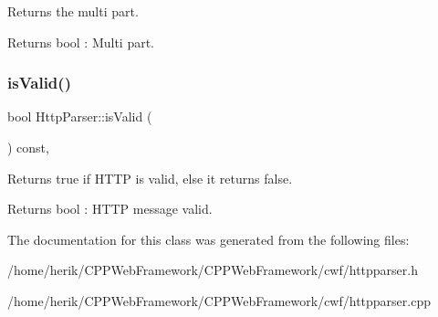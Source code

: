 Returns the multi part. 

\begin{DoxyReturn}{Returns}
bool \+: Multi part. 
\end{DoxyReturn}
\mbox{\label{class_http_parser_a6d5020425a4dff7b78acbf37a20cccba}} 
\subsubsection{\texorpdfstring{is\+Valid()}{isValid()}}
{\footnotesize\ttfamily bool Http\+Parser\+::is\+Valid (\begin{DoxyParamCaption}{ }\end{DoxyParamCaption}) const\hspace{0.3cm}{\ttfamily [inline]}, {\ttfamily [noexcept]}}



Returns true if H\+T\+TP is valid, else it returns false. 

\begin{DoxyReturn}{Returns}
bool \+: H\+T\+TP message valid. 
\end{DoxyReturn}


The documentation for this class was generated from the following files\+:\begin{DoxyCompactItemize}
\item 
/home/herik/\+C\+P\+P\+Web\+Framework/\+C\+P\+P\+Web\+Framework/cwf/httpparser.\+h\item 
/home/herik/\+C\+P\+P\+Web\+Framework/\+C\+P\+P\+Web\+Framework/cwf/httpparser.\+cpp\end{DoxyCompactItemize}

